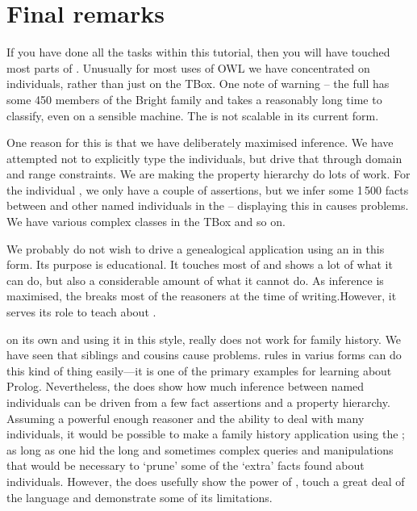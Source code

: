 \chapter{Final remarks}
\label{chap:final}

If you have done all the tasks within this tutorial, then you will have touched most parts of \owlii. Unusually for most uses of OWL we have concentrated on individuals, rather than just on the TBox. One note of warning -- the full \fhkb has some 450 members of the Bright family and takes a reasonably long time to classify, even on a sensible machine. The \fhkb is not scalable in its current form.\herebedragons

One reason for this is that we have deliberately maximised inference. We have attempted not to explicitly type the individuals, but drive that through domain and range constraints. We are making the property hierarchy do lots of work. For the individual \rds, we only have a couple of assertions, but we infer some 1\,500 facts between \rds and other named individuals in the \fhkb -- displaying this in \protege causes problems. We have various complex classes in the TBox and so on.

We probably do not wish to drive a genealogical application using an \fhkb in this form. Its purpose is educational. It touches most of \owlii and shows a lot of what it can do, but also a considerable amount of what it cannot do. As inference is maximised, the \fhkb breaks most of the \owlii reasoners at the time of writing.\herebedragons However, it serves its role to teach about \owlii.

\owlii on its own and using it in this style, really does not work for family history. We have seen that siblings and cousins cause problems. rules in varius  forms can do this kind of thing easily---it is one of  the primary examples for learning about Prolog. Nevertheless, the \fhkb does show how much inference between named individuals can be driven from a few fact assertions and a property hierarchy. Assuming a powerful enough reasoner and the ability to deal with many individuals, it would be possible  to make a family history application using the \fhkb; as long as one hid the long and sometimes complex   queries and manipulations that would be necessary to `prune' some of the `extra' facts found about individuals. However, the \fhkb does usefully show the power of \owlii, touch a great deal of the language and demonstrate some of its limitations.



